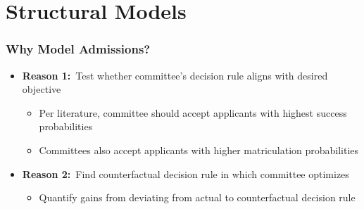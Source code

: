 \documentclass[12pt, aspectratio=169]{beamer}
\begin{document}
\section{Structural Models}
\addtocounter{framenumber}{-1}
\begin{frame}[label=wma]
\frametitle{Why Model Admissions?}
\begin{itemize}
\item \textbf{Reason 1:}\ Test whether committee's decision rule aligns with desired objective
\vspace{10pt}
\begin{itemize}
\item Per literature, committee should accept applicants with highest success probabilities
\vspace{10pt}
\item Committees also accept applicants with higher matriculation probabilities
\vspace{20pt}
\end{itemize}
\item \textbf{Reason 2:}\ Find counterfactual decision rule in which committee optimizes
\vspace{10pt}
\begin{itemize}
\item Quantify gains from deviating from actual to counterfactual decision rule
\end{itemize}
\end{itemize}
\end{frame}
\end{document}
